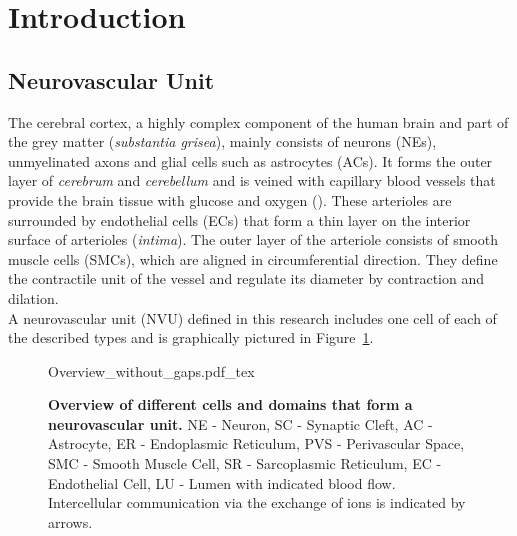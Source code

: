 \section{Introduction}
\subsection{Neurovascular Unit}

The cerebral cortex, a highly complex component of the human brain and part of the grey matter (\textit{substantia grisea}),   mainly consists of neurons (\gls{NE}s), unmyelinated axons and glial cells such as astrocytes (\gls{AC}s). It forms the outer layer of \textit{cerebrum} and \textit{cerebellum} and is veined with capillary blood vessels that provide the brain tissue with glucose and oxygen (\citet{Shipp2007}). These arterioles are surrounded by endothelial cells (\gls{EC}s) that form a thin layer on the interior surface of arterioles (\textit{intima}). The outer layer of the arteriole consists of smooth muscle cells (\gls{SMC}s), which are  aligned in circumferential direction. They define the contractile unit of the vessel and regulate its diameter by contraction and dilation.\\

A neurovascular unit (\gls{NVU}) defined in this research includes one cell of each of the described types and is graphically pictured in Figure~\ref{Overview1}. \\ 
\begin{figure}[h!]
  \centering
  \def\svgwidth{450pt}
  \scriptsize 
  {Overview_without_gaps.pdf_tex}
  \caption{\textbf{Overview of different cells and domains that form a neurovascular unit.}  \gls{NE} - Neuron, \gls{SC} - Synaptic Cleft, \gls{AC}  - Astrocyte,  \gls{ER}  - Endoplasmic Reticulum,  \gls{PVS}  - Perivascular Space,  \gls{SMC}  - Smooth Muscle Cell, SR - Sarcoplasmic Reticulum,  \gls{EC}  - Endothelial Cell,     \gls{LU}  - Lumen with indicated blood flow. Intercellular communication via the exchange of ions is indicated by arrows. }
\label{Overview1}
\end{figure}

